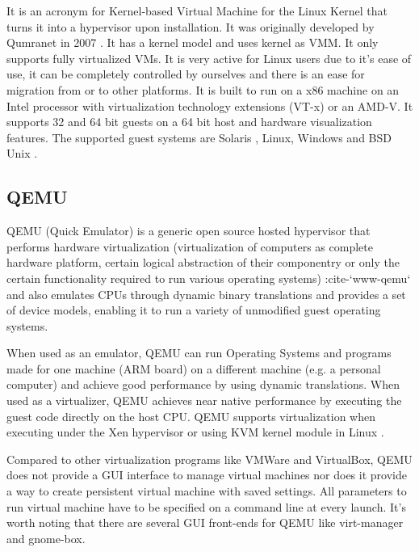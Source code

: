     It is an acronym for Kernel-based Virtual Machine for the Linux
     Kernel that turns it into a hypervisor upon installation. It was
     originally developed by Qumranet in 2007 \cite{www-KVM-wiki}. It
     has a kernel model and uses kernel as VMM. It only supports fully
     virtualized VMs. It is very active for Linux users due to it’s
     ease of use, it can be completely controlled by ourselves and
     there is an ease for migration from or to other platforms. It is
     built to run on a x86 machine on an Intel processor with
     virtualization technology extensions (VT-x) or an AMD-V. It
     supports 32 and 64 bit guests on a 64 bit host and hardware
     visualization features. The supported guest systems are Solaris ,
     Linux, Windows and BSD Unix \cite{www-KVM-webpage}.

\subsection{ QEMU}
     
     QEMU (Quick Emulator) is a generic open source hosted hypervisor
     \cite{www-hypervisor} that performs hardware virtualization
     (virtualization of computers as complete hardware platform,
     certain logical abstraction of their componentry or only the
     certain functionality required to run various operating systems)
     :cite-`www-qemu` and also emulates CPUs through dynamic binary
     translations and provides a set of device models, enabling it to
     run a variety of unmodified guest operating systems.
     
     When used as an emulator, QEMU can run Operating Systems and
     programs made for one machine (ARM board) on a different machine
     (e.g. a personal computer) and achieve good performance by using
     dynamic translations.  When used as a virtualizer, QEMU achieves
     near native performance by executing the guest code directly on
     the host CPU. QEMU supports virtualization when executing under
     the Xen hypervisor or using KVM kernel module in Linux
     \cite{www-qemuwiki}.

     Compared to other virtualization programs like VMWare and VirtualBox,
     QEMU does not provide a GUI interface to manage virtual machines nor
     does it provide a way to create persistent virtual machine with saved
     settings. All parameters to run virtual machine have to be specified
     on a command line at every launch. It’s worth noting that there are
     several GUI front-ends for QEMU like virt-manager and gnome-box.

